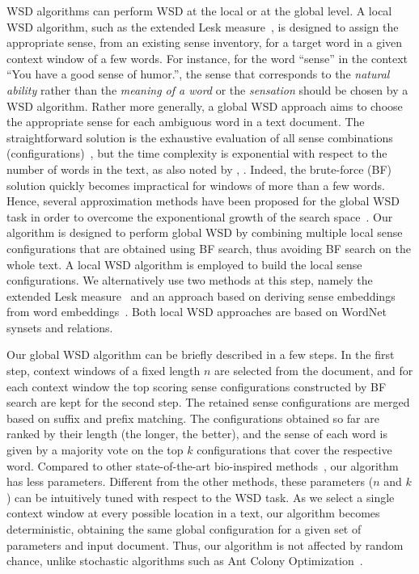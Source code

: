 \documentclass[11pt]{article}
\begin{document}
WSD algorithms can perform WSD at the local or at the global level. A local WSD algorithm, such as the extended Lesk measure~\cite{Lesk-1986,Banerjee-CICLING-2002,Banerjee-IJCAI-2003}, is designed to assign the appropriate sense, from an existing sense inventory, for a target word in a given context window of a few words. For instance, for the word ``sense'' in the context ``You have a good sense of humor.'', the sense that corresponds to the \emph{natural ability} rather than the \emph{meaning of a word} or the \emph{sensation} should be chosen by a WSD algorithm. Rather more generally, a global WSD approach aims to choose the appropriate sense for each ambiguous word in a text document. The straightforward solution is the exhaustive evaluation of all sense combinations (configurations)~\cite{Patwardhan-CICLing-2003}, but the time complexity is exponential with respect to the number of words in the text, as also noted by , . Indeed, the brute-force (BF) solution quickly becomes impractical for windows of more than a few words. Hence, several approximation methods have been proposed for the global WSD task in order to overcome the exponentional growth of the search space~\cite{Schwab-COLING-2012,Schwab-WET-2013}. Our algorithm is designed to perform global WSD by combining multiple local sense configurations that are obtained using BF search, thus avoiding BF search on the whole text. A local WSD algorithm is employed to build the local sense configurations. We alternatively use two methods at this step, namely the extended Lesk measure~\cite{Banerjee-CICLING-2002,Banerjee-IJCAI-2003} and an approach based on deriving sense embeddings from word embeddings~\cite{Bengio-JMLR-2003,Collobert-ICML-2008,Mikolov-NIPS-2013}. Both local WSD approaches are based on WordNet synsets and relations.

Our global WSD algorithm can be briefly described in a few steps. In the first step, context windows of a fixed length $n$ are selected from the document, and for each context window the top scoring sense configurations constructed by BF search are kept for the second step. The retained sense configurations are merged based on suffix and prefix matching. The configurations obtained so far are ranked by their length (the longer, the better), and the sense of each word is given by a majority vote on the top $k$ configurations that cover the respective word. Compared to other state-of-the-art bio-inspired methods~\cite{Schwab-COLING-2012,Schwab-WET-2013}, our algorithm has less parameters. Different from the other methods, these parameters ($n$ and $k$) can be intuitively tuned with respect to the WSD task. As we select a single context window at every possible location in a text, our algorithm becomes deterministic, obtaining the same global configuration for a given set of parameters and input document. Thus, our algorithm is not affected by random chance, unlike stochastic algorithms such as Ant Colony Optimization~\cite{Lafourcade-ACO-2010,Schwab-COLING-2012,Schwab-WET-2013}.
\end{document}
